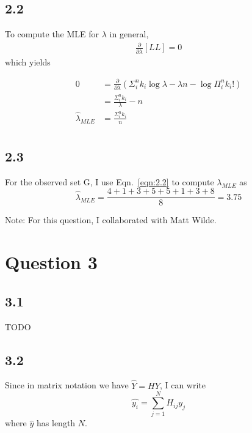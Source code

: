 \documentclass[12pt]{amsart}
\begin{document}
\subsection*{2.2}

To compute the MLE for $\lambda$ in general,
\begin{equation} 
\begin{split}
\frac{\partial}{\partial \lambda} \left[ LL \right] = 0
\end{split}
\end{equation}
which yields

\begin{equation} \label{eqn:2.2}
\begin{split}
0 & = \frac{\partial}{\partial \lambda} \left( \Sigma_i^n k_i \log \lambda - \lambda n - \log \Pi_i^n k_i ! \right) \\ 
& = \frac{\Sigma_i^n k_i}{\lambda} - n \\
\hat{\lambda}_{MLE} & = \frac{\Sigma_i^n k_i}{n} \\
\end{split}
\end{equation}

\subsection*{2.3}
For the observed set G, I use Eqn.~\ref{eqn:2.2} to compute $\lambda_{MLE}$ as
\begin{equation}
\hat{\lambda}_{MLE} = \frac{4+1+3+5+5+1+3+8}{8} = 3.75
\end{equation}

Note: For this question, I collaborated with Matt Wilde.


\section*{Question 3}

\subsection*{3.1}

TODO

\subsection*{3.2}

Since in matrix notation we have $\hat{Y} = HY$, I can write 
\begin{equation}
\hat{y_i} = \sum_{j=1}^N H_{ij}y_j
\end{equation}
where $\hat{y}$ has length $N$.
\end{document}
